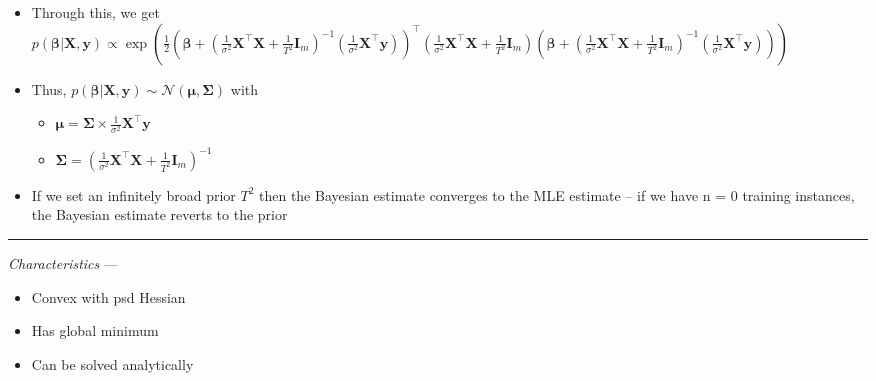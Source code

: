 \begin{itemize}
\begin{itemize}
        \item Through this, we get $p( \boldsymbol{\beta} | \boldsymbol{X}, \boldsymbol{y} ) \propto \exp (  \frac{1}{2}  ( \boldsymbol{\beta} + ( \frac{1}{\sigma^2} \boldsymbol{X}^\intercal \boldsymbol{X} + \frac{1}{T^2} \boldsymbol{I}_m )^{-1} ( \frac{1}{\sigma^2} \boldsymbol{X}^\intercal \boldsymbol{y} ) )^\intercal ( \frac{1}{\sigma^2} \boldsymbol{X}^\intercal \boldsymbol{X} + \frac{1}{T^2} \boldsymbol{I}_m ) ( \boldsymbol{\beta} + ( \frac{1}{\sigma^2} \boldsymbol{X}^\intercal \boldsymbol{X} + \frac{1}{T^2} \boldsymbol{I}_m )^{-1} ( \frac{1}{\sigma^2} \boldsymbol{X}^\intercal \boldsymbol{y} ) ) )$
        \item Thus, $p( \boldsymbol{\beta} | \boldsymbol{X}, \boldsymbol{y} ) \sim \mathcal{N}(\boldsymbol{\mu}, \boldsymbol{\Sigma})$ with
        \begin{itemize}
            \item $\boldsymbol{\mu} = \boldsymbol{\Sigma} \times \frac{1}{\sigma^2} \boldsymbol{X}^\intercal \boldsymbol{y}$
            \item $\boldsymbol{\Sigma} = ( \frac{1}{\sigma^2} \boldsymbol{X}^\intercal \boldsymbol{X} + \frac{1}{T^2} \boldsymbol{I}_m )^{-1}$
        \end{itemize}
        \item If we set an infinitely broad prior $T^2$ then the Bayesian estimate converges to the MLE estimate – if we have n = 0 training instances, the Bayesian estimate reverts to the prior
    \end{itemize}
\end{itemize}

{\color{lightgray}\hrule height 0.001mm}

\emph{Characteristics} --- 
\begin{itemize}
    \item Convex with psd Hessian
    \item Has global minimum
    \item Can be solved analytically 
\end{itemize}